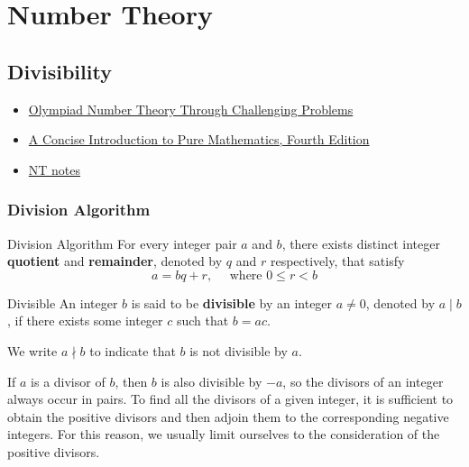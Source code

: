 \part{Number Theory}
\chapter{Divisibility}
\begin{itemize}
\item \href{https://s3.amazonaws.com/aops-cdn.artofproblemsolving.com/resources/articles/olympiad-number-theory.pdf}{Olympiad Number Theory Through Challenging Problems}
\item \href{https://web.math.ucsb.edu/~agboola/teaching/2021/fall/8/liebeck.pdf}{A Concise Introduction to Pure Mathematics, Fourth Edition}
\item \href{https://artofproblemsolving.com/articles/files/SatoNT.pdf}{NT notes}
\end{itemize}

\section{Division Algorithm}
\begin{thrm}{Division Algorithm}{}
For every integer pair $a$ and $b$, there exists distinct integer \textbf{quotient} and \textbf{remainder}, denoted by $q$ and $r$ respectively, that satisfy
\[ a = bq + r, \quad \text{ where } 0 \le r < b \]
\end{thrm}

\begin{defn}{Divisible}{}
An integer $b$ is said to be \textbf{divisible} by an integer $a \neq 0$, denoted by $a \mid b$, if there exists some integer $c$ such that $b = ac$. 

We write $a \nmid b$ to indicate that $b$ is not divisible by $a$.
\end{defn}

\begin{remark}
If $a$ is a divisor of $b$, then $b$ is also divisible by $-a$, so the divisors of an integer always occur in pairs. To find all the divisors of a given integer, it is sufficient to obtain the positive divisors and then adjoin them to the corresponding negative integers. For this reason, we usually limit ourselves to the consideration of the positive divisors.
\end{remark}

